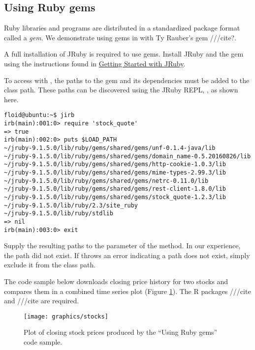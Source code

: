 \subsection{Using Ruby gems}

Ruby libraries and programs are distributed in a standardized package format called a \textit{gem}. We demonstrate using gems in with Ty Rauber's \href{https://github.com/tyrauber/stock_quote}{} gem ///cite?. 

A full installation of JRuby is required to use gems. Install JRuby and the  gem using the instructions found in \href{https://github.com/jruby/jruby/wiki/GettingStarted}{Getting Started with JRuby}.%

To access  with , the paths to the gem and its dependencies must be added to the  class path. These paths can be discovered using the JRuby REPL, , as shown here.

\begin{verbatim}
floid@ubuntu:~$ jirb
irb(main):001:0> require 'stock_quote'
=> true
irb(main):002:0> puts $LOAD_PATH
~/jruby-9.1.5.0/lib/ruby/gems/shared/gems/unf-0.1.4-java/lib
~/jruby-9.1.5.0/lib/ruby/gems/shared/gems/domain_name-0.5.20160826/lib
~/jruby-9.1.5.0/lib/ruby/gems/shared/gems/http-cookie-1.0.3/lib
~/jruby-9.1.5.0/lib/ruby/gems/shared/gems/mime-types-2.99.3/lib
~/jruby-9.1.5.0/lib/ruby/gems/shared/gems/netrc-0.11.0/lib
~/jruby-9.1.5.0/lib/ruby/gems/shared/gems/rest-client-1.8.0/lib
~/jruby-9.1.5.0/lib/ruby/gems/shared/gems/stock_quote-1.2.3/lib
~/jruby-9.1.5.0/lib/ruby/2.3/site_ruby
~/jruby-9.1.5.0/lib/ruby/stdlib
=> nil
irb(main):003:0> exit
\end{verbatim}

Supply the resulting paths to the  parameter of the   method. In our experience, the  path did not exist. If  throws an error indicating a path does not exist, simply exclude it from the class path.

The code sample below downloads closing price history for two stocks and compares them in a combined time series plot (Figure \ref{fig:stocks}). The R packages  ///cite and  ///cite are required. %

\begin{figure}[h]
\centering
\texttt{[image: graphics/stocks]}
\caption{Plot of closing stock prices produced by the “Using Ruby gems” code sample.}
\label{fig:stocks}
\end{figure}

